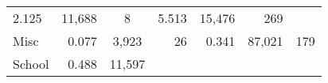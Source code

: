 \documentclass[]{book}
\theoremstyle{definition}
\theoremstyle{definition}
\theoremstyle{definition}
\theoremstyle{remark}
\begin{document}
\begin{longtable}[]{@{}lrcrrrr@{}}
\begin{minipage}[t]{0.12\columnwidth}
2.125\strut
\end{minipage} & \begin{minipage}[t]{0.11\columnwidth}\centering\strut
11,688\strut
\end{minipage} & \begin{minipage}[t]{0.11\columnwidth}\raggedleft\strut
8\strut
\end{minipage} & \begin{minipage}[t]{0.12\columnwidth}\raggedleft\strut
5.513\strut
\end{minipage} & \begin{minipage}[t]{0.11\columnwidth}\raggedleft\strut
15,476\strut
\end{minipage} & \begin{minipage}[t]{0.11\columnwidth}\raggedleft\strut
269\strut
\end{minipage}\tabularnewline
\begin{minipage}[t]{0.10\columnwidth}\raggedright\strut
Misc\strut
\end{minipage} & \begin{minipage}[t]{0.12\columnwidth}\raggedleft\strut
0.077\strut
\end{minipage} & \begin{minipage}[t]{0.11\columnwidth}\centering\strut
3,923\strut
\end{minipage} & \begin{minipage}[t]{0.11\columnwidth}\raggedleft\strut
26\strut
\end{minipage} & \begin{minipage}[t]{0.12\columnwidth}\raggedleft\strut
0.341\strut
\end{minipage} & \begin{minipage}[t]{0.11\columnwidth}\raggedleft\strut
87,021\strut
\end{minipage} & \begin{minipage}[t]{0.11\columnwidth}\raggedleft\strut
179\strut
\end{minipage}\tabularnewline
\begin{minipage}[t]{0.10\columnwidth}\raggedright\strut
School\strut
\end{minipage} & \begin{minipage}[t]{0.12\columnwidth}\raggedleft\strut
0.488\strut
\end{minipage} & \begin{minipage}[t]{0.11\columnwidth}\centering\strut
11,597\strut
\end{minipage} & \begin{minipage}[t]{0.11\columnwidth}\raggedleft\strut

\end{minipage}
\end{longtable}
\end{document}

